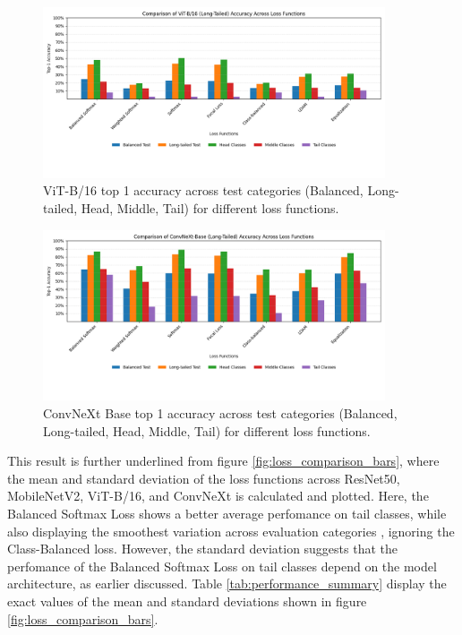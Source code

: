 \begin{figure}[h!]
    \centering
    \includegraphics[width=0.9\textwidth]{Images/Plots/vit_lt_loss_comparison.png}
    \caption{ViT-B/16 top 1 accuracy across test categories (Balanced, Long-tailed, Head, Middle, Tail) for different loss functions.}
    \label{fig:vit_lt_loss_comparison}
\end{figure}

\begin{figure}[h!]
    \centering
    \includegraphics[width=0.9\textwidth]{Images/Plots/convnext_lt_loss_comparison.png}
    \caption{ConvNeXt Base top 1 accuracy across test categories (Balanced, Long-tailed, Head, Middle, Tail) for different loss functions.}
    \label{fig:conv_lt_loss_comparison}
\end{figure}

This result is further underlined from figure \ref{fig:loss_comparison_bars}, where the mean and standard deviation of the loss functions across ResNet50, MobileNetV2, ViT-B/16, and ConvNeXt is calculated and plotted. Here, the Balanced Softmax Loss shows a better average perfomance on tail classes, while also displaying the smoothest variation across evaluation categories , ignoring the Class-Balanced loss. However, the standard deviation suggests that the perfomance of the Balanced Softmax Loss on tail classes depend on the model architecture, as earlier discussed. Table \ref{tab:performance_summary} display the exact values of the mean and standard deviations shown in figure \ref{fig:loss_comparison_bars}. 

